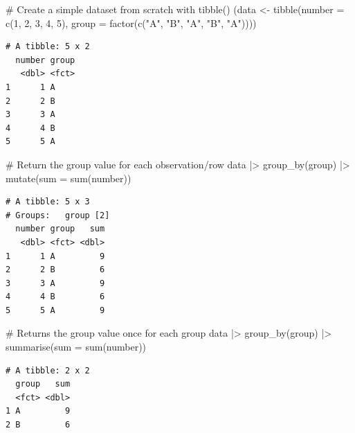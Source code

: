 \documentclass[
  letterpaper,
]{krantz}
\makeatletter
\newenvironment{Shaded}{\begin{snugshade}}{\end{snugshade}}
\newcommand{\AttributeTok}[1]{\textcolor[rgb]{0.40,0.45,0.13}{#1}}
\newcommand{\CommentTok}[1]{\textcolor[rgb]{0.37,0.37,0.37}{#1}}
\newcommand{\DecValTok}[1]{\textcolor[rgb]{0.68,0.00,0.00}{#1}}
\newcommand{\FunctionTok}[1]{\textcolor[rgb]{0.28,0.35,0.67}{#1}}
\newcommand{\NormalTok}[1]{\textcolor[rgb]{0.00,0.23,0.31}{#1}}
\newcommand{\OtherTok}[1]{\textcolor[rgb]{0.00,0.23,0.31}{#1}}
\newcommand{\SpecialCharTok}[1]{\textcolor[rgb]{0.37,0.37,0.37}{#1}}
\newcommand{\StringTok}[1]{\textcolor[rgb]{0.13,0.47,0.30}{#1}}
\newenvironment{kframe}{%
\medskip{}
\setlength{\fboxsep}{.8em}
 \def\at@end@of@kframe{}%
 \ifinner\ifhmode%
  \def\at@end@of@kframe{\end{minipage}}%
  \begin{minipage}{\columnwidth}%
 \fi\fi%
 \def\FrameCommand##1{\hskip\@totalleftmargin \hskip-\fboxsep
 \colorbox{shadecolor}{##1}\hskip-\fboxsep
     \hskip-\linewidth \hskip-\@totalleftmargin \hskip\columnwidth}%
 \MakeFramed {\advance\hsize-\width
   \@totalleftmargin\z@ \linewidth\hsize
   \@setminipage}}%
 {\par\unskip\endMakeFramed%
 \at@end@of@kframe}
\renewenvironment{Shaded}{\begin{kframe}}{\end{kframe}}
\makeatother
\begin{document}
\begin{Shaded}
\begin{Highlighting}[]
\CommentTok{\# Create a simple dataset from scratch with tibble()}
\NormalTok{(data }\OtherTok{\textless{}{-}} \FunctionTok{tibble}\NormalTok{(}\AttributeTok{number =} \FunctionTok{c}\NormalTok{(}\DecValTok{1}\NormalTok{, }\DecValTok{2}\NormalTok{, }\DecValTok{3}\NormalTok{, }\DecValTok{4}\NormalTok{, }\DecValTok{5}\NormalTok{),}
               \AttributeTok{group =} \FunctionTok{factor}\NormalTok{(}\FunctionTok{c}\NormalTok{(}\StringTok{"A"}\NormalTok{, }\StringTok{"B"}\NormalTok{, }\StringTok{"A"}\NormalTok{, }\StringTok{"B"}\NormalTok{, }\StringTok{"A"}\NormalTok{))))}
\end{Highlighting}
\end{Shaded}

\begin{verbatim}
# A tibble: 5 x 2
  number group
   <dbl> <fct>
1      1 A    
2      2 B    
3      3 A    
4      4 B    
5      5 A    
\end{verbatim}

\begin{Shaded}
\begin{Highlighting}[]
\CommentTok{\# Return the group value for each observation/row}
\NormalTok{data }\SpecialCharTok{|\textgreater{}}
  \FunctionTok{group\_by}\NormalTok{(group) }\SpecialCharTok{|\textgreater{}}
  \FunctionTok{mutate}\NormalTok{(}\AttributeTok{sum =} \FunctionTok{sum}\NormalTok{(number))}
\end{Highlighting}
\end{Shaded}

\begin{verbatim}
# A tibble: 5 x 3
# Groups:   group [2]
  number group   sum
   <dbl> <fct> <dbl>
1      1 A         9
2      2 B         6
3      3 A         9
4      4 B         6
5      5 A         9
\end{verbatim}

\begin{Shaded}
\begin{Highlighting}[]
\CommentTok{\# Returns the group value once for each group}
\NormalTok{data }\SpecialCharTok{|\textgreater{}}
  \FunctionTok{group\_by}\NormalTok{(group) }\SpecialCharTok{|\textgreater{}}
  \FunctionTok{summarise}\NormalTok{(}\AttributeTok{sum =} \FunctionTok{sum}\NormalTok{(number))}
\end{Highlighting}
\end{Shaded}

\begin{verbatim}
# A tibble: 2 x 2
  group   sum
  <fct> <dbl>
1 A         9
2 B         6
\end{verbatim}
\end{document}
